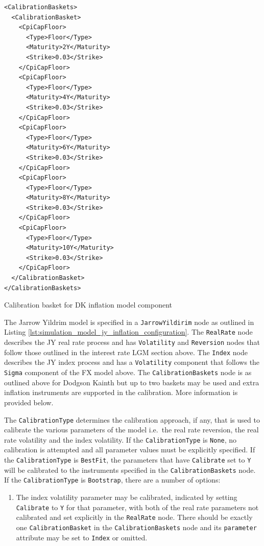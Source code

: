 \documentclass[12pt, a4paper]{article}
\begin{document}
{{\begin{listing}[H]
\begin{verbatim}
<CalibrationBaskets>
  <CalibrationBasket>
    <CpiCapFloor>
      <Type>Floor</Type>
      <Maturity>2Y</Maturity>
      <Strike>0.03</Strike>
    </CpiCapFloor>
    <CpiCapFloor>
      <Type>Floor</Type>
      <Maturity>4Y</Maturity>
      <Strike>0.03</Strike>
    </CpiCapFloor>
    <CpiCapFloor>
      <Type>Floor</Type>
      <Maturity>6Y</Maturity>
      <Strike>0.03</Strike>
    </CpiCapFloor>
    <CpiCapFloor>
      <Type>Floor</Type>
      <Maturity>8Y</Maturity>
      <Strike>0.03</Strike>
    </CpiCapFloor>
    <CpiCapFloor>
      <Type>Floor</Type>
      <Maturity>10Y</Maturity>
      <Strike>0.03</Strike>
    </CpiCapFloor>
  </CalibrationBasket>
</CalibrationBaskets>
\end{verbatim}
\caption{Calibration basket for DK inflation model component}
\label{lst:dk_inflation_calibration_basket}
\end{listing}

The Jarrow Yildrim model is specified in a \lstinline!JarrowYildirim! node as outlined in Listing \ref{lst:simulation_model_jy_inflation_configuration}. The \lstinline!RealRate! 
node describes the JY real rate process and has \lstinline!Volatility! and \lstinline!Reversion! nodes that follow those outlined in the interest rate LGM section above. The  
\lstinline!Index! node describes the JY index process and has a \lstinline!Volatility! component that follows the \lstinline!Sigma! component of the FX model above. The 
\lstinline!CalibrationBaskets! node is as outlined above for Dodgson Kainth but up to two baskets may be used and extra inflation instruments are supported in the calibration. More 
information is provided below.

The \lstinline!CalibrationType! determines the calibration approach, if any, that is used to calibrate the various parameters of the model i.e.\ the real rate reversion, the real 
rate volatility and the index volatility. If the \lstinline!CalibrationType! is \lstinline!None!, no calibration is attempted and all parameter values must be explicitly specified.
If the \lstinline!CalibrationType! is \lstinline!BestFit!, the parameters that have \lstinline!Calibrate! set to \lstinline!Y! will be calibrated to the instruments specified in 
the \lstinline!CalibrationBaskets! node. If the \lstinline!CalibrationType! is \lstinline!Bootstrap!, there are a number of options:

\begin{enumerate}
\item
The index volatility parameter may be calibrated, indicated by setting \lstinline!Calibrate! to \lstinline!Y! for that parameter, with both of the real rate parameters not calibrated 
and set explicitly in the \lstinline!RealRate! node. There should be exactly one \lstinline!CalibrationBasket! in the \lstinline!CalibrationBaskets! node and its \lstinline!parameter! 
attribute may be set to \lstinline!Index! or omitted.


\end{enumerate}}}
\end{document}
